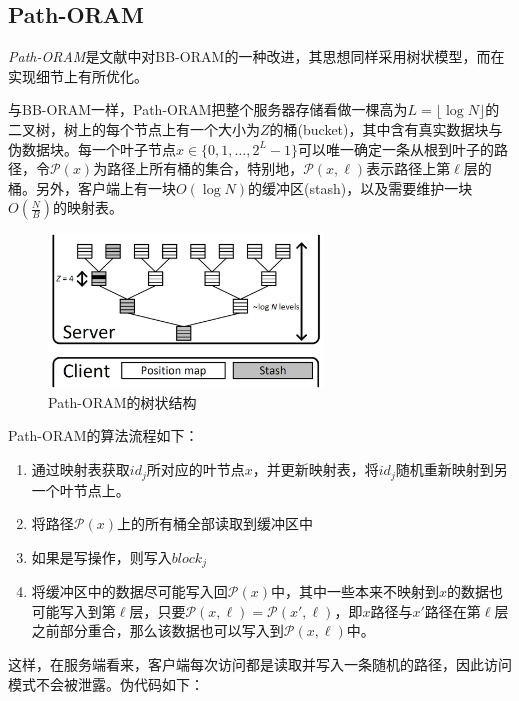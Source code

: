 \subsection{Path-ORAM}
\textit{Path-ORAM}是文献\cite{ref9}中对BB-ORAM的一种改进，其思想同样采用树状模型，而在实现细节上有所优化。\par
与BB-ORAM一样，Path-ORAM把整个服务器存储看做一棵高为$L=\lfloor\log N\rfloor$的二叉树，树上的每个节点上有一个大小为$Z$的桶(bucket)，其中含有真实数据块与伪数据块。每一个叶子节点$x\in\{0,1,\ldots,2^L-1\}$可以唯一确定一条从根到叶子的路径，令$\mathcal{P}(x)$为路径上所有桶的集合，特别地，$\mathcal{P}(x,\ell)$表示路径上第$\ell$层的桶。另外，客户端上有一块$O(\log N)$的缓冲区(stash)，以及需要维护一块$O(\frac{N}{B})$的映射表。
\begin{figure}
    \centering
    \includegraphics[width=0.65\textwidth]{orams/path.pdf}
    \caption{Path-ORAM的树状结构}
    \label{fig:path}
\end{figure}
\noindent Path-ORAM的算法流程如下：
\begin{enumerate}
    \item 通过映射表获取$id_j$所对应的叶节点$x$，并更新映射表，将$id_j$随机重新映射到另一个叶节点上。
    \item 将路径$\mathcal{P}(x)$上的所有桶全部读取到缓冲区中
    \item 如果是写操作，则写入$block_j$
    \item 将缓冲区中的数据尽可能写入回$\mathcal{P}(x)$中，其中一些本来不映射到$x$的数据也可能写入到第$\ell$层，只要$\mathcal{P}(x,\ell)=\mathcal{P}(x',\ell)$，即$x$路径与$x'$路径在第$\ell$层之前部分重合，那么该数据也可以写入到$\mathcal{P}(x,\ell)$中。
\end{enumerate}\par
这样，在服务端看来，客户端每次访问都是读取并写入一条随机的路径，因此访问模式不会被泄露。伪代码如下：
